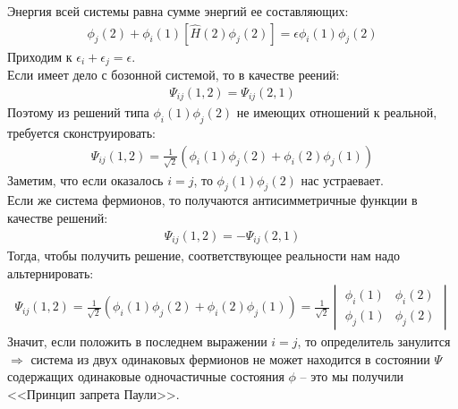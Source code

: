 \documentclass[__main__.tex]{subfiles}
\begin{document}
Энергия всей системы равна сумме энергий ее составляющих:
\begin{gather}
    [\hat{H}(1)\phi_i(1)]\phi_j(2)+\phi_i(1)[\hat{H}(2)\phi_j(2)]=\epsilon\phi_i(1)\phi_j(2)
\end{gather}
Приходим к $\epsilon_i+\epsilon_j=\epsilon$.\\
Если имеет дело с бозонной системой, то в качестве реений:\\
\begin{gather}
    \Psi_{ij}(1,2) = \Psi_{ij}(2,1)
\end{gather}
Поэтому из решений типа $\phi_i(1)\phi_j(2)$ не имеющих отношений к реальной, требуется сконструировать:\\
\begin{gather}
    \Psi_{ij}(1,2)=\frac{1}{\sqrt{2}}(\phi_i(1)\phi_j(2)+\phi_i(2)\phi_j(1))
\end{gather}
Заметим, что если оказалось $i=j$, то $\phi_j(1)\phi_j(2)$ нас устраевает.\\
Если же система фермионов, то получаются антисимметричные функции в качестве решений:
\begin{gather}
    \Psi_{ij}(1,2) = -\Psi_{ij}(2,1)
\end{gather}
Тогда, чтобы получить решение, соответствующее реальности нам надо альтернировать:\\
\begin{gather}
    \Psi_{ij}(1,2)=\frac{1}{\sqrt{2}}(\phi_i(1)\phi_j(2)+\phi_i(2)\phi_j(1)) = \frac{1}{\sqrt{2}} \begin{vmatrix}
        \phi_i(1) & \phi_i(2) \\
        \phi_j(1) & \phi_j(2)
    \end{vmatrix}
\end{gather}
Значит, если положить в последнем выражении $i=j$, то определитель занулится $\Longrightarrow$ система из двух одинаковых фермионов не может находится в состоянии $\Psi$ содержащих одинаковые одночастичные состояния $\phi$ -- это мы получили <<Принцип запрета Паули>>.
\end{document}
